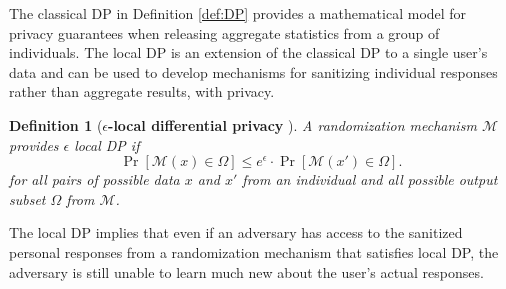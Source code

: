 \documentclass[10pt,journal,compsoc]{IEEEtran}
\newtheorem{defn}{Definition}
\newcommand{\M}{\mathcal{M}}
\begin{document}
The classical DP in Definition \ref{def:DP} provides a mathematical model for privacy guarantees when releasing  aggregate statistics from a group of individuals. The local DP \cite{localDP2011, duchi2013local} is an extension of the classical DP to a single user's data and can be used to develop mechanisms for sanitizing individual responses rather than aggregate results, with privacy.
\begin{defn}[\textbf{$\epsilon$-local differential privacy} \cite{kasiviswanathan2011can, duchi2013local}]\label{def:localDP} 
A randomization mechanism $\M$ provides $\epsilon$ local DP if
\begin{equation} 
\Pr[\M(x)\in\Omega]\le{e^{\epsilon}}\cdot{\Pr[\M(x')\in{\Omega}]}.
\end{equation}
for all pairs of possible data $x$ and $x'$ from an individual and all possible output subset $\Omega$ from $\M$.
\end{defn}
The local DP implies that even if an adversary has access to the  sanitized  personal responses from a randomization mechanism that satisfies local DP, the adversary is still unable to learn much new about the user's actual responses. 
\end{document}
